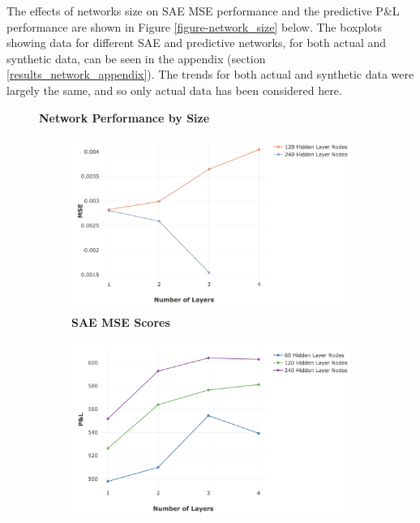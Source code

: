 \documentclass[a4paper,11pt,oneside]{article}
\theoremstyle{plain}
\theoremstyle{definition}
\begin{document}
	The effects of networks size on SAE MSE performance and the predictive P\&L performance are shown in Figure \ref{figure-network_size} below. The boxplots showing data for different SAE and predictive networks, for both actual and synthetic data, can be seen in the appendix (section \ref{results_network_appendix}). The trends for both actual and synthetic data were largely the same, and so only actual data has been considered here.
	
	\begin{figure}[H]
		\centering
		\textbf{Network Performance by Size}
		\begin{subfigure}{.5\textwidth}
			\centering 
			\includegraphics[scale=0.25]{images/results/network/actual_mse_lines.png}
			\caption{\textbf{SAE MSE Scores} 
				\newline }
			\label{figure-actual_mse_lines}
		\end{subfigure}%
		\begin{subfigure}{.5\textwidth}
			\centering 
			\includegraphics[scale=0.26]{images/results/network/actual_pl_lines.png}

\end{subfigure}
\end{figure}
\end{document}
